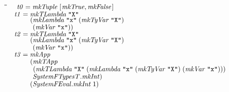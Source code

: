 \documentclass[10pt]{article}
\newlength{\lwidth}\setlength{\lwidth}{4.5cm}
\newlength{\cwidth}\setlength{\cwidth}{8mm} %
\newcommand{\Conid}[1]{\mathit{#1}}
\newcommand{\Varid}[1]{\mathit{#1}}
\begin{document}
\begin{tabbing}
\qquad\=\hspace{\lwidth}\=\hspace{\cwidth}\=\+\kill
${\hskip1.00em\relax\Varid{t0}\mathrel{=}\Varid{mkTuple}\;[\mskip1.5mu \Varid{mkTrue},\Varid{mkFalse}\mskip1.5mu]}$\\
${\hskip1.00em\relax\Varid{t1}\mathrel{=}\Varid{mkTLambda}\;\text{\tt \char34 X\char34}}$\\
${\hskip1.00em\relax\phantom{\Varid{t1}\mathrel{=}\mbox{}}(\Varid{mkLambda}\;\text{\tt \char34 x\char34}\;(\Varid{mkTyVar}\;\text{\tt \char34 X\char34})}$\\
${\hskip1.00em\relax\phantom{\Varid{t1}\mathrel{=}\mbox{}}\phantom{(\mbox{}}(\Varid{mkVar}\;\text{\tt \char34 x\char34}))}$\\
${\hskip1.00em\relax\Varid{t2}\mathrel{=}\Varid{mkTLambda}\;\text{\tt \char34 X\char34}}$\\
${\hskip1.00em\relax\phantom{\Varid{t2}\mathrel{=}\mbox{}}(\Varid{mkLambda}\;\text{\tt \char34 x\char34}\;(\Varid{mkTyVar}\;\text{\tt \char34 X\char34})}$\\
${\hskip1.00em\relax\phantom{\Varid{t2}\mathrel{=}\mbox{}}\phantom{(\mbox{}}(\Varid{mkVar}\;\text{\tt \char34 x\char34}))}$\\
${\hskip1.00em\relax\Varid{t3}\mathrel{=}\Varid{mkApp}}$\\
${\hskip1.00em\relax\phantom{\Varid{t3}\mathrel{=}\mbox{}}(\Varid{mkTApp}}$\\
${\hskip1.00em\relax\phantom{\Varid{t3}\mathrel{=}\mbox{}}\phantom{(\mbox{}}(\Varid{mkTLambda}\;\text{\tt \char34 X\char34}\;(\Varid{mkLambda}\;\text{\tt \char34 x\char34}\;(\Varid{mkTyVar}\;\text{\tt \char34 X\char34})\;(\Varid{mkVar}\;\text{\tt \char34 x\char34})))}$\\
${\hskip1.00em\relax\phantom{\Varid{t3}\mathrel{=}\mbox{}}\phantom{(\mbox{}}\Varid{\Conid{SystemFTypesT}.mkInt})}$\\
${\hskip1.00em\relax\phantom{\Varid{t3}\mathrel{=}\mbox{}}(\Varid{\Conid{SystemFEval}.mkInt}\;\mathrm{1})}$
\end{tabbing}

\end{document}
